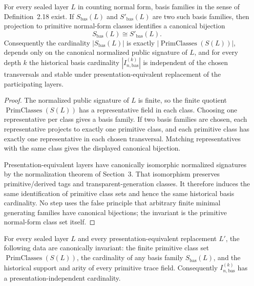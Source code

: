 \begin{theorem}
For every sealed layer \(L\) in counting normal form, basis families in the sense of
Definition~2.18 exist.  If \(S_{\mathrm{bas}}(L)\) and \(S'_{\mathrm{bas}}(L)\) are two such basis
families, then projection to primitive normal-form classes identifies a canonical bijection
\[
  S_{\mathrm{bas}}(L) \cong S'_{\mathrm{bas}}(L).
\]
Consequently the cardinality \(|S_{\mathrm{bas}}(L)|\) is exactly
\(|\operatorname{PrimClasses}(S(L))|\), depends only on the canonical normalized public
signature of \(L\), and for every depth \(k\) the historical basis cardinality
\(|I_{n,\mathrm{bas}}^{(k)}|\) is independent of the chosen transversals and stable under
presentation-equivalent replacement of the participating layers.
\end{theorem}

\begin{proof}
The normalized public signature of \(L\) is finite, so the finite quotient
\(\operatorname{PrimClasses}(S(L))\) has a representative field in each class.  Choosing one
representative per class gives a basis family.  If two basis families are chosen, each
representative projects to exactly one primitive class, and each primitive class has exactly
one representative in each chosen transversal.  Matching representatives with the same class
gives the displayed canonical bijection.

Presentation-equivalent layers have canonically isomorphic normalized signatures by the
normalization theorem of Section~3.  That isomorphism preserves primitive/derived tags and
transparent-generation classes.  It therefore induces the same identification of primitive
class sets and hence the same historical basis cardinality.  No step uses the false principle
that arbitrary finite minimal generating families have canonical bijections; the invariant is
the primitive normal-form class set itself.
\end{proof}

\begin{lemma}
For every sealed layer \(L\) and every presentation-equivalent replacement \(L'\), the
following data are canonically invariant: the finite primitive class set
\(\operatorname{PrimClasses}(S(L))\), the cardinality of any basis family
\(S_{\mathrm{bas}}(L)\), and the historical support and arity of every primitive trace field.
Consequently \(I_{n,\mathrm{bas}}^{(k)}\) has a presentation-independent cardinality.
\end{lemma}

